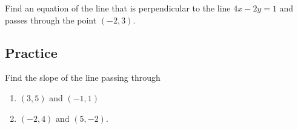 \begin{example}

Find an equation of the line that is perpendicular to the line
\(4x-2y=1\) and passes through the point \((-2,3)\).

\end{example}
\vspace*{6\baselineskip}

\subsection{Practice}

\begin{exercise}

Find the slope of the line passing through

\begin{enumerate}
\item
  \((3,5)\) and \((-1, 1)\)
\item
  \((-2,4)\) and \((5, -2)\).
\end{enumerate}

\end{exercise}
\vspace*{2\baselineskip}

